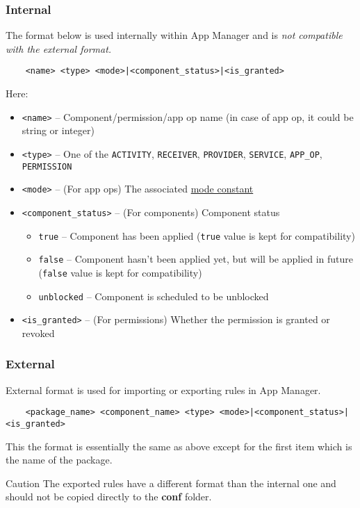 \subsubsection{Internal}
The format below is used internally within App Manager and is \textit{not compatible with the external format.}
\begin{Verbatim}
    <name> <type> <mode>|<component_status>|<is_granted>
\end{Verbatim}
Here:
\begin{itemize}
    \item \texttt{<name>} -- Component/permission/app op name (in case of app op, it could be string or integer)
    \item \texttt{<type>} -- One of the \texttt{ACTIVITY}, \texttt{RECEIVER}, \texttt{PROVIDER}, \texttt{SERVICE},
    \texttt{APP\_OP},  \texttt{PERMISSION}
    \item \texttt{<mode>} -- (For app ops) The associated \hyperref[subsec:mode-constants]{mode constant}
    \item \texttt{<component\_status>} -- (For components) Component status
    \begin{itemize}
        \item \texttt{true} -- Component has been applied (\texttt{true} value is kept for compatibility)
        \item \texttt{false} -- Component hasn't been applied yet, but will be applied in future (\texttt{false} value
        is kept for compatibility)
        \item \texttt{unblocked} -- Component is scheduled to be unblocked
    \end{itemize}
    \item \texttt{<is\_granted>} -- (For permissions) Whether the permission is granted or revoked
\end{itemize}

\subsubsection{External}
External format is used for importing or exporting rules in App Manager.
\begin{Verbatim}
    <package_name> <component_name> <type> <mode>|<component_status>|<is_granted>
\end{Verbatim}
This the format is essentially the same as above except for the first item which is the name of the package.

\begin{danger}{Caution}
    The exported rules have a different format than the internal one and should not be copied directly to the
    \textbf{conf} folder.
\end{danger}
